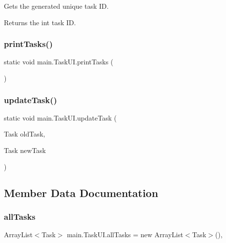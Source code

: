 Gets the generated unique task ID. \begin{DoxyReturn}{Returns}
the int task ID. 
\end{DoxyReturn}
\mbox{\label{classmain_1_1_task_u_i_ab8829737e1e3e206c3d94ad3097b1df1}} 
\subsubsection{print\+Tasks()}
{\footnotesize\ttfamily static void main.\+Task\+U\+I.\+print\+Tasks (\begin{DoxyParamCaption}{ }\end{DoxyParamCaption})\hspace{0.3cm}{\ttfamily [static]}}

\mbox{\label{classmain_1_1_task_u_i_a9d72cad3179b9312d7ffe042092e5f6f}} 
\subsubsection{update\+Task()}
{\footnotesize\ttfamily static void main.\+Task\+U\+I.\+update\+Task (\begin{DoxyParamCaption}\item[{Task}]{old\+Task,  }\item[{Task}]{new\+Task }\end{DoxyParamCaption})\hspace{0.3cm}{\ttfamily [static]}}



\subsection{Member Data Documentation}
\mbox{\label{classmain_1_1_task_u_i_a05bb12a52cb66bc7ef6b0a001108bd06}} 
\subsubsection{all\+Tasks}
{\footnotesize\ttfamily Array\+List$<$Task$>$ main.\+Task\+U\+I.\+all\+Tasks = new Array\+List$<$Task$>$()\hspace{0.3cm}{\ttfamily [static]}, {\ttfamily [private]}}

